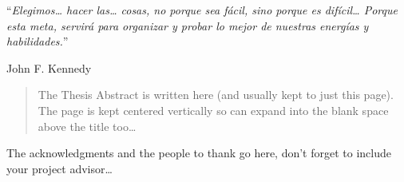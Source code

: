 \documentclass[
11pt, %
spanish, %
singlespacing, %
headsepline, %
]{MastersDoctoralThesis} %
\begin{document}


\noindent\enquote{\itshape Elegimos\ldots{} hacer las\ldots{} cosas, no porque sea fácil, sino porque es difícil\ldots{} Porque esta meta, servirá para organizar y probar lo mejor de nuestras energías y habilidades.}

\hfill John F. Kennedy


\begin{abstract}
\addchaptertocentry{\abstractname} %
The Thesis Abstract is written here (and usually kept to just this page). The page is kept centered vertically so can expand into the blank space above the title too\ldots
\end{abstract}


\begin{acknowledgements}
The acknowledgments and the people to thank go here, don't forget to include your project advisor\ldots
\end{acknowledgements}


\tableofcontents %

\listoffigures %

\listoftables %

\end{document}
